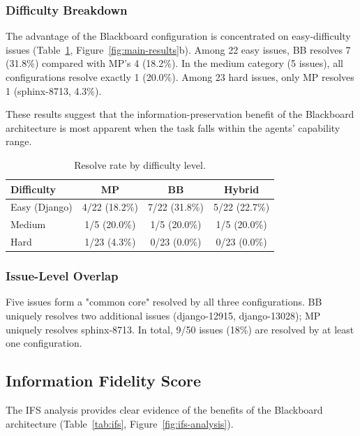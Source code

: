 \documentclass{ieeeaccess}
\begin{document}
\subsubsection{Difficulty Breakdown}

The advantage of the Blackboard configuration is concentrated on easy-difficulty issues (Table~\ref{tab:difficulty}, Figure~\ref{fig:main-results}b). Among 22 easy issues, BB resolves 7 (31.8\%) compared with MP's 4 (18.2\%). In the medium category (5 issues), all configurations resolve exactly 1 (20.0\%). Among 23 hard issues, only MP resolves 1 (sphinx-8713, 4.3\%).

These results suggest that the information-preservation benefit of the Blackboard architecture is most apparent when the task falls within the agents' capability range.

\begin{table}[!ht]
\centering
\caption{Resolve rate by difficulty level.}
\label{tab:difficulty}
\begin{tabular}{lccc}
\toprule
\textbf{Difficulty} & \textbf{MP} & \textbf{BB} & \textbf{Hybrid} \\
\midrule
Easy (Django) & 4/22 (18.2\%) & 7/22 (31.8\%) & 5/22 (22.7\%) \\
Medium & 1/5 (20.0\%) & 1/5 (20.0\%) & 1/5 (20.0\%) \\
Hard & 1/23 (4.3\%) & 0/23 (0.0\%) & 0/23 (0.0\%) \\
\bottomrule
\end{tabular}
\end{table}

\subsubsection{Issue-Level Overlap}

Five issues form a "common core" resolved by all three configurations. BB uniquely resolves two additional issues (django-12915, django-13028); MP uniquely resolves sphinx-8713. In total, 9/50 issues (18\%) are resolved by at least one configuration.

\subsection{Information Fidelity Score}
\label{sec:ifs-results}

The IFS analysis provides clear evidence of the benefits of the Blackboard architecture (Table~\ref{tab:ifs}, Figure~\ref{fig:ifs-analysis}).
\end{document}
